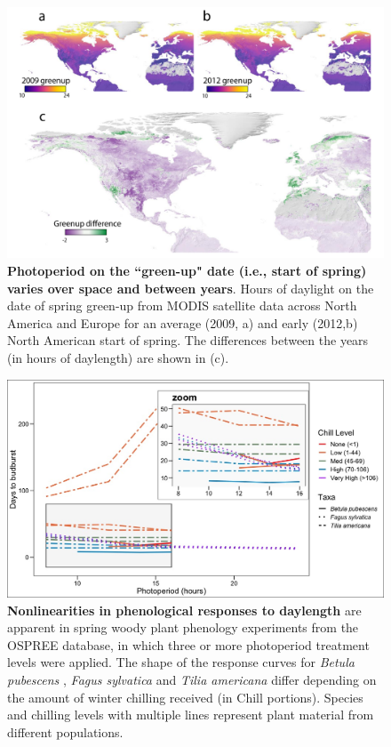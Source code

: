 \documentclass{article}
\begin{document}
 \begin{figure}[p]
\centering
\includegraphics{..//..//docs/photoperiod/figures/Greenup_corr.pdf} %
\caption{\textbf{Photoperiod on the ``green-up" date (i.e., start of spring) varies over space and between years}. Hours of daylight on the date of spring green-up from MODIS satellite data across North America and Europe for an average (2009, a) and  early (2012,b) North American start of spring. The differences between the years (in hours of daylength) are shown in (c).}%
 \label{fig:greenup}%
 \end{figure}
 
\begin{figure}[p]
\includegraphics{..//..//analyses/photoperiod/figures/Photo_curv_FINAL.jpeg} 
\caption{\textbf{Nonlinearities in phenological responses to daylength} are apparent in spring woody plant phenology experiments from the OSPREE database, in which three or more photoperiod treatment levels were applied. The shape of the response curves for \textit{Betula pubescens} \citep{Caffarra:2011b}, \textit{Fagus sylvatica} \citep{Heide:1993a} and \textit{Tilia americana} \citep{Ashby:1962aa} differ depending on the amount of winter chilling received (in Chill portions). Species and chilling levels with multiple lines represent plant material from different populations.}
 \label{fig:photocurve}
 \end{figure}
\end{document}
